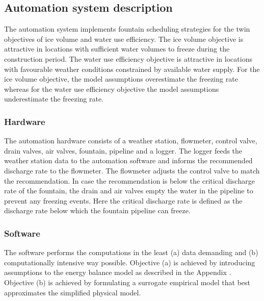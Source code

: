 \documentclass[tc, manuscript]{copernicus}
\begin{document}
\subsection{Automation system description}

The automation system implements fountain scheduling strategies for the twin objectives of ice volume and water
use efficiency. The ice volume objective is attractive in locations with sufficient water volumes to freeze
during the construction period. The water use efficiency objective is attractive in locations with favourable
weather conditions constrained by available water supply. For the ice volume objective, the model assumptions
overestimate the freezing rate whereas for the water use efficiency objective the model assumptions
underestimate the freezing rate. 

\subsubsection{Hardware}
The automation hardware consists of a weather station, flowmeter, control valve, drain valves, air valves,
fountain, pipeline and a logger. The logger feeds the weather station data to the automation software and
informs the recommended discharge rate to the flowmeter. The flowmeter adjusts the control valve to match the
recommendation. In case the recommendation is below the critical discharge rate of the fountain, the drain and
air valves empty the water in the pipeline to prevent any freezing events. Here the critical discharge rate is
defined as the discharge rate below which the fountain pipeline can freeze.


\subsubsection{Software}

The software performs the computations in the least (a) data demanding and (b) computationally intensive way
possible. Objective (a) is achieved by introducing assumptions to the energy balance model as described in the
Appendix . Objective (b) is achieved by formulating a surrogate empirical model that best approximates the
simplified physical model. 
\end{document}

